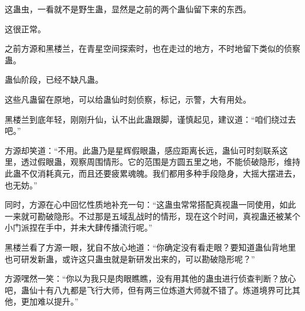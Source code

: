 \begin{this_body}
这蛊虫，一看就不是野生蛊，显然是之前的两个蛊仙留下来的东西。

这很正常。

之前方源和黑楼兰，在青星空间探索时，也在走过的地方，不时地留下类似的侦察蛊。

蛊仙阶段，已经不缺凡蛊。

这些凡蛊留在原地，可以给蛊仙时刻侦察，标记，示警，大有用处。

黑楼兰到底年轻，刚刚升仙，认不出此蛊跟脚，谨慎起见，建议道：“咱们绕过去吧。”

方源却笑道：“不用。此蛊乃是星辉假眼蛊，感应距离长远，蛊仙可时刻联系这里，透过假眼蛊，观察周围情形。它的范围是方圆五里之地，不能侦破隐形，维持此蛊不仅消耗真元，而且还要疲累魂魄。我们都用多种手段隐身，大摇大摆进去，也无妨。”

同时，方源在心中回忆性质地补充一句：“这蛊虫常常搭配真视蛊一同使用，如此一来就可勘破隐形。不过那是五域乱战时的情形，现在这个时间，真视蛊还被某个小门派捏在手中，并未大肆传播流行呢。”

黑楼兰看了方源一眼，犹自不放心地道：“你确定没有看走眼？要知道蛊仙背地里也可研发新蛊，或许这只蛊虫就是新研发出来的，可以勘破隐形呢？”

方源嘿然一笑：“你以为我只是肉眼瞧瞧，没有用其他的蛊虫进行侦查判断？放心吧，蛊仙十有八九都是飞行大师，但有两三位炼道大师就不错了。炼道境界可比其他，更加难以提升。”

\end{this_body}

